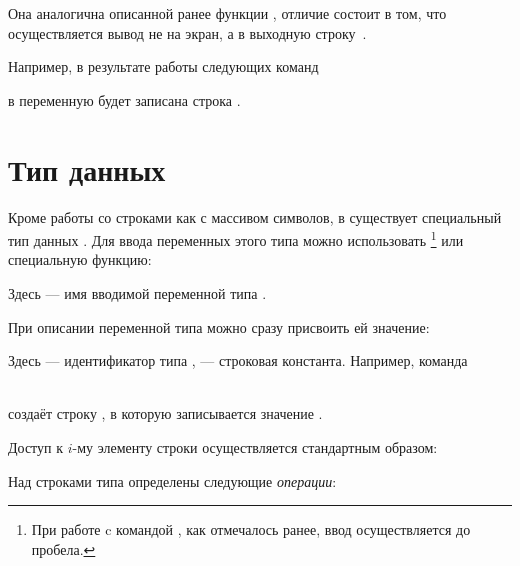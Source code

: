
Она аналогична описанной ранее функции , отличие состоит в том, что осуществляется вывод не на
экран, а в выходную строку~.

Например, в результате работы следующих команд



в переменную  будет записана строка .

\section[Тип данных string]{Тип данных }\label{ch08:3}
Кроме работы со строками как с массивом символов, в  существует специальный тип данных .
Для ввода переменных этого типа можно использовать \footnote{При работе c командой
, как отмечалось ранее, ввод осуществляется до пробела.} или специальную функцию:


Здесь  --- имя вводимой переменной типа .

При описании переменной типа  можно сразу присвоить ей значение:


Здесь  --- идентификатор типа ,  --- строковая
константа. Например, команда

\\
создаёт строку , в которую записывается значение .

Доступ к $i$-му элементу строки осуществляется стандартным образом:


Над строками типа  определены следующие \emph{операции}:


